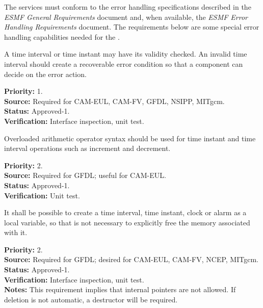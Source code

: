 
\label{req:errors}

The \funcname services must conform to the error handling specifications described 
in the {\it ESMF General Requirements} document \cite{ESMFGenReq} and, when available, 
the {\it ESMF Error Handling Requirements} document.  The requirements below are some
special error handling capabilities needed for the \funcname.

A time interval or time instant may have its validity checked.  An invalid time 
interval should create a recoverable error condition so that a component can decide 
on the error action.
\begin{reqlist}
{\bf Priority:} 1. \\
{\bf Source:} Required for CAM-EUL, CAM-FV, GFDL, NSIPP, MITgcm.\\
{\bf Status:} Approved-1. \\
{\bf Verification:} Interface inspection, unit test. 
\end{reqlist}

Overloaded arithmetic operator syntax should be used for time instant and
time interval operations such as increment and decrement.
\begin{reqlist}
{\bf Priority:} 2. \\
{\bf Source:} Required for GFDL; useful for CAM-EUL. \\
{\bf Status:} Approved-1. \\
{\bf Verification:} Unit test. 
\end{reqlist}

It shall be possible to create a time interval, time instant, clock or 
alarm as a local variable, so that is not necessary to explicitly free the memory 
associated with it. 
\begin{reqlist}
{\bf Priority:} 2. \\
{\bf Source:} Required for GFDL; desired for CAM-EUL, CAM-FV, NCEP, MITgcm. \\
{\bf Status:} Approved-1. \\
{\bf Verification:} Interface inspection, unit test. \\ 
{\bf Notes:} This requirement implies that internal pointers are not allowed.  
If deletion is not automatic, a destructor will be required. 
\end{reqlist}

